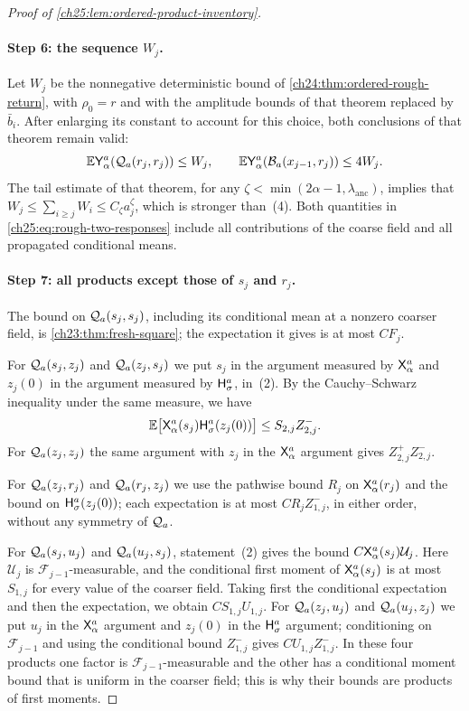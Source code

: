 \begin{proof}[Proof of \cref{ch25:lem:ordered-product-inventory}]
\paragraph{Step 6: the sequence $W_j$.}
Let $W_j$ be the nonnegative deterministic bound of \cref{ch24:thm:ordered-rough-return}, with $\rho_0=r$ and with the amplitude bounds of that theorem replaced by $\bar b_i$. After enlarging its constant to account for this choice, both conclusions of that theorem remain valid:
\begin{equation}\label{ch25:eq:rough-two-responses}
 \mathbb E\mathsf Y_{\alpha}^{a}(\mathcal Q_{a}(r_j,r_j))\le W_j,\qquad
 \mathbb E\mathsf Y_{\alpha}^{a}(\mathcal B_{a}(x_{j-1},r_j))\le4W_j.
\end{equation}
The tail estimate of that theorem, for any $\zeta<\min(2\alpha-1,\lambda_{\mathrm{anc}})$, implies that $W_j\le\sum_{i\ge j}W_i\le C_\zeta a_j^\zeta$, which is stronger than~(4). Both quantities in \eqref{ch25:eq:rough-two-responses} include all contributions of the coarse field and all propagated conditional means.

\paragraph{Step 7: all products except those of $s_j$ and $r_j$.}
The bound on $\mathcal Q_{a}(s_j,s_j)$, including its conditional mean at a nonzero coarser field, is \cref{ch23:thm:fresh-square}; the expectation it gives is at most $CF_j$.

For $\mathcal Q_{a}(s_j,z_j)$ and $\mathcal Q_{a}(z_j,s_j)$ we put $s_j$ in the argument measured by $\mathsf X_{\alpha}^{a}$ and $z_j(0)$ in the argument measured by $\mathsf H_{\sigma}^{a}$, in~(2). By the Cauchy--Schwarz inequality under the same measure, we have
\[
 \mathbb E\bigl[\mathsf X_{\alpha}^{a}(s_j)\mathsf H_{\sigma}^{a}(z_j(0))\bigr]\le S_{2,j}Z^-_{2,j}.
\]
For $\mathcal Q_{a}(z_j,z_j)$ the same argument with $z_j$ in the $\mathsf X_{\alpha}^{a}$ argument gives $Z^+_{2,j}Z^-_{2,j}$.

For $\mathcal Q_{a}(z_j,r_j)$ and $\mathcal Q_{a}(r_j,z_j)$ we use the pathwise bound $R_j$ on $\mathsf X_{\alpha}^{a}(r_j)$ and the bound on $\mathsf H_{\sigma}^{a}(z_j(0))$; each expectation is at most $CR_jZ^-_{1,j}$, in either order, without any symmetry of $\mathcal Q_{a}$.

For $\mathcal Q_{a}(s_j,u_j)$ and $\mathcal Q_{a}(u_j,s_j)$, statement~(2) gives the bound $C\mathsf X_{\alpha}^{a}(s_j)\mathcal U_j$. Here $\mathcal U_j$ is $\mathcal F_{j-1}$-measurable, and the conditional first moment of $\mathsf X_{\alpha}^{a}(s_j)$ is at most $S_{1,j}$ for every value of the coarser field. Taking first the conditional expectation and then the expectation, we obtain $CS_{1,j}U_{1,j}$. For $\mathcal Q_{a}(z_j,u_j)$ and $\mathcal Q_{a}(u_j,z_j)$ we put $u_j$ in the $\mathsf X_{\alpha}^{a}$ argument and $z_j(0)$ in the $\mathsf H_{\sigma}^{a}$ argument; conditioning on $\mathcal F_{j-1}$ and using the conditional bound $Z^-_{1,j}$ gives $CU_{1,j}Z^-_{1,j}$. In these four products one factor is $\mathcal F_{j-1}$-measurable and the other has a conditional moment bound that is uniform in the coarser field; this is why their bounds are products of first moments.


\end{proof}
